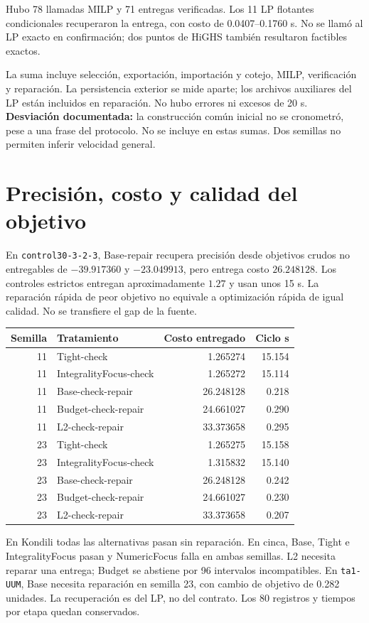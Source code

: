\documentclass[10pt,a4paper]{article}
\begin{document}
Hubo 78 llamadas MILP y 71
entregas verificadas. Los 11 LP flotantes condicionales recuperaron
la entrega, con costo de 0.0407--0.1760 s. No se llamó al LP exacto en
confirmación; dos puntos de HiGHS también resultaron factibles exactos.

La suma incluye selección, exportación, importación y cotejo, MILP,
verificación y reparación. La persistencia exterior se mide aparte; los
archivos auxiliares del LP están incluidos en reparación. No hubo errores
ni excesos de 20 s. \textbf{Desviación documentada:} la construcción común
inicial no se cronometró, pese a una frase del protocolo. No se incluye en
estas sumas. Dos semillas no permiten inferir velocidad general.
\newpage
\section*{Precisión, costo y calidad del objetivo}
En \texttt{control30-3-2-3}, Base-repair recupera precisión desde objetivos
crudos no entregables de $-39.917360$ y $-23.049913$, pero entrega costo
$26.248128$. Los controles estrictos entregan aproximadamente $1.27$ y
usan unos 15 s. La reparación rápida de peor objetivo no equivale a
optimización rápida de igual calidad. No se transfiere el gap de la fuente.
\begin{center}\small
\begin{tabular}{@{}rlrr@{}}\toprule
Semilla & Tratamiento & Costo entregado & Ciclo s\\\midrule
11 & Tight-check & 1.265274 & 15.154\\
11 & IntegralityFocus-check & 1.265272 & 15.114\\
11 & Base-check-repair & 26.248128 & 0.218\\
11 & Budget-check-repair & 24.661027 & 0.290\\
11 & L2-check-repair & 33.373658 & 0.295\\
23 & Tight-check & 1.265275 & 15.158\\
23 & IntegralityFocus-check & 1.315832 & 15.140\\
23 & Base-check-repair & 26.248128 & 0.242\\
23 & Budget-check-repair & 24.661027 & 0.230\\
23 & L2-check-repair & 33.373658 & 0.207\\
\bottomrule\end{tabular}\end{center}
En Kondili todas las alternativas pasan sin reparación. En cinca, Base,
Tight e IntegralityFocus pasan y NumericFocus falla en ambas semillas.
L2 necesita reparar una entrega; Budget se abstiene por 96 intervalos
incompatibles. En \texttt{ta1-UUM}, Base necesita reparación en semilla 23,
con cambio de objetivo de 0.282 unidades. La recuperación es del LP,
no del contrato. Los 80 registros y tiempos por etapa quedan conservados.
\end{document}
